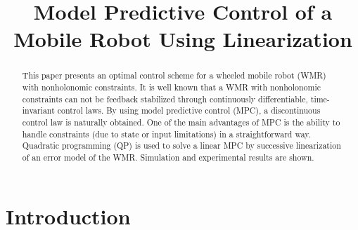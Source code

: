 \documentclass[conference]{IEEEtran} %
\begin{document}
\title{Model Predictive Control of a Mobile Robot Using Linearization}

\author{
\and
{}
\and
{}
}

\maketitle

\begin{abstract}
This paper presents an optimal control scheme for a wheeled mobile robot (WMR) with nonholonomic constraints. It is well known that a WMR with nonholonomic constraints can not be feedback stabilized through continuously differentiable, time-invariant control laws. By using model predictive control (MPC), a discontinuous control law is naturally obtained. One of the main advantages of MPC is the ability to handle constraints (due to state or input limitations) in a straightforward way. Quadratic programming (QP) is used to solve a linear MPC by successive linearization of an error model of the WMR. Simulation and experimental results are shown.
\end{abstract}

\section{Introduction}
\label{sec:intro}
\end{document}
